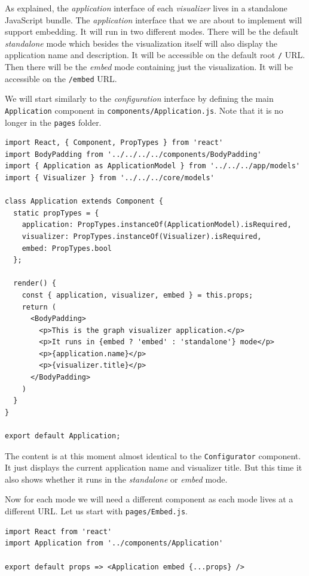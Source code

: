 As explained, the \emph{application} interface of each \emph{visualizer} lives in a standalone JavaScript bundle. The \emph{application} interface that we are about to implement will support embedding. It will run in two different modes. There will be the default \emph{standalone} mode which besides the visualization itself will also display the application name and description. It will be accessible on the default root \texttt{/} URL. Then there will be the \emph{embed} mode containing just the visualization. It will be accessible on the \texttt{/embed} URL.

We will start similarly to the \emph{configuration} interface by defining the main \texttt{Application} component in \texttt{components/Application.js}. Note that it is no longer in the \texttt{pages} folder.

\begin{verbatim}
import React, { Component, PropTypes } from 'react'
import BodyPadding from '../../../../components/BodyPadding'
import { Application as ApplicationModel } from '../../../app/models'
import { Visualizer } from '../../../core/models'

class Application extends Component {
  static propTypes = {
    application: PropTypes.instanceOf(ApplicationModel).isRequired,
    visualizer: PropTypes.instanceOf(Visualizer).isRequired,
    embed: PropTypes.bool
  };

  render() {
    const { application, visualizer, embed } = this.props;
    return (
      <BodyPadding>
        <p>This is the graph visualizer application.</p>
        <p>It runs in {embed ? 'embed' : 'standalone'} mode</p>
        <p>{application.name}</p>
        <p>{visualizer.title}</p>
      </BodyPadding>
    )
  }
}

export default Application;
\end{verbatim}

The content is at this moment almost identical to the \texttt{Configurator} component. It just displays the current application name and visualizer title. But this time it also shows whether it runs in the \emph{standalone} or \emph{embed} mode. 

Now for each mode we will need a different component as each mode lives at a different URL. Let us start with \texttt{pages/Embed.js}.

\begin{verbatim}
import React from 'react'
import Application from '../components/Application'

export default props => <Application embed {...props} />
\end{verbatim}

